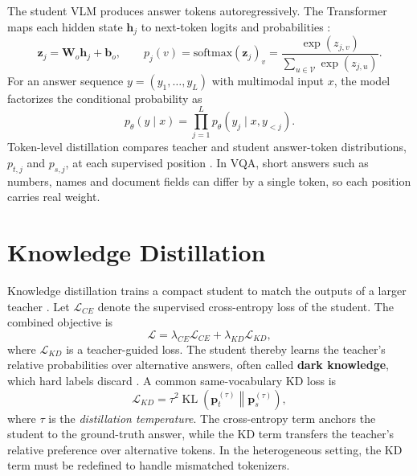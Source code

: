 The student VLM produces answer tokens autoregressively. The Transformer maps
each hidden state \(\mathbf{h}_j\) to next-token logits and probabilities
\cite{vaswani2017attentionneed}:
\begin{equation}
\mathbf{z}_j=\mathbf{W}_{o}\mathbf{h}_j+\mathbf{b}_{o},
\qquad
p_j(v)=\mathrm{softmax}(\mathbf{z}_j)_v
=
\frac{\exp(z_{j,v})}{\sum_{u\in\mathcal{V}}\exp(z_{j,u})}.
\end{equation}
For an answer sequence \(y=(y_1,\ldots,y_L)\) with multimodal input \(x\), the model factorizes the
conditional probability as
\begin{equation}
p_{\theta}(y\mid x)
=
\prod_{j=1}^{L}p_{\theta}(y_j\mid x,y_{<j}).
\end{equation}
Token-level distillation compares teacher and student answer-token
distributions, \(p_{t,j}\) and \(p_{s,j}\), at each supervised position
\cite{vaswani2017attentionneed,hinton2015distillingknowledgeneuralnetwork}. In VQA, short answers such as numbers, names and document fields can differ by a single
token, so each position carries real weight.

\section{Knowledge Distillation}

Knowledge distillation trains a compact student to match the outputs of a
larger teacher
\cite{hinton2015distillingknowledgeneuralnetwork,xu2024surveyknowledgedistillationlarge}.
Let \(\mathcal{L}_{CE}\) denote the supervised cross-entropy loss of the student.
The combined objective is
\begin{equation}
\mathcal{L}
=
\lambda_{CE}\mathcal{L}_{CE}
+
\lambda_{KD}\mathcal{L}_{KD},
\end{equation}
where \(\mathcal{L}_{KD}\) is a teacher-guided loss. The student thereby learns
the teacher's relative probabilities over alternative answers, often called
\textbf{dark knowledge}, which hard labels discard
\cite{hinton2015distillingknowledgeneuralnetwork}.
A common same-vocabulary KD loss is
\begin{equation}
\mathcal{L}_{KD}
=
\tau^2
\operatorname{KL}\!\left(
\mathbf{p}_t^{(\tau)}
\middle\|
\mathbf{p}_s^{(\tau)}
\right),
\end{equation}
where \(\tau\) is the \textit{distillation temperature}. The cross-entropy term anchors
the student to the ground-truth answer, while the KD term transfers the
teacher's relative preference over alternative tokens. In the heterogeneous setting, the KD term must be redefined to handle
mismatched tokenizers.

